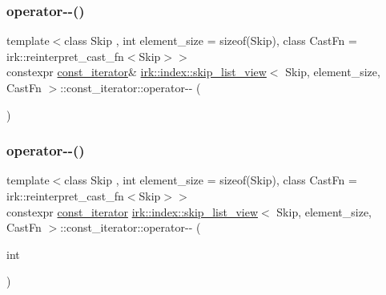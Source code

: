 \mbox{\label{structirk_1_1index_1_1skip__list__view_1_1const__iterator_a08a278c8a621e0a900e44922e05aa013}} 
\subsubsection{\texorpdfstring{operator-\/-\/()}{operator--()}\hspace{0.1cm}{\footnotesize\ttfamily [1/2]}}
{\footnotesize\ttfamily template$<$class Skip , int element\+\_\+size = sizeof(\+Skip), class Cast\+Fn  = irk\+::reinterpret\+\_\+cast\+\_\+fn$<$\+Skip$>$$>$ \\
constexpr \mbox{\hyperlink{structirk_1_1index_1_1skip__list__view_1_1const__iterator}{const\+\_\+iterator}}\& \mbox{\hyperlink{classirk_1_1index_1_1skip__list__view}{irk\+::index\+::skip\+\_\+list\+\_\+view}}$<$ Skip, element\+\_\+size, Cast\+Fn $>$\+::const\+\_\+iterator\+::operator-\/-\/ (\begin{DoxyParamCaption}{ }\end{DoxyParamCaption})\hspace{0.3cm}{\ttfamily [inline]}}

\mbox{\label{structirk_1_1index_1_1skip__list__view_1_1const__iterator_a05bfba775a7a9f5036ed8d00f92e67ad}} 
\subsubsection{\texorpdfstring{operator-\/-\/()}{operator--()}\hspace{0.1cm}{\footnotesize\ttfamily [2/2]}}
{\footnotesize\ttfamily template$<$class Skip , int element\+\_\+size = sizeof(\+Skip), class Cast\+Fn  = irk\+::reinterpret\+\_\+cast\+\_\+fn$<$\+Skip$>$$>$ \\
constexpr \mbox{\hyperlink{structirk_1_1index_1_1skip__list__view_1_1const__iterator}{const\+\_\+iterator}} \mbox{\hyperlink{classirk_1_1index_1_1skip__list__view}{irk\+::index\+::skip\+\_\+list\+\_\+view}}$<$ Skip, element\+\_\+size, Cast\+Fn $>$\+::const\+\_\+iterator\+::operator-\/-\/ (\begin{DoxyParamCaption}\item[{int}]{ }\end{DoxyParamCaption})\hspace{0.3cm}{\ttfamily [inline]}}

